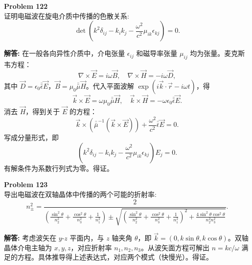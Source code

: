 \documentclass[12pt, a4paper, oneside]{ctexart}
\newenvironment{solution}{\par\noindent\textbf{解答:}\quad}{\par}
\begin{document}
\begin{mdframed}[backgroundcolor=gray!10, linewidth=0pt]
    \textbf{Problem 122} \\
    证明电磁波在旋电介质中传播的色散关系:
    \[
    \det\left( k^2 \delta_{ij} - k_i k_j - \frac{\omega^2}{c^2} \mu_{ik} \epsilon_{kj} \right) = 0.
    \]
\end{mdframed}
\begin{solution}
    在一般各向异性介质中，介电张量 $\epsilon_{ij}$ 和磁导率张量 $\mu_{ij}$ 均为张量。麦克斯韦方程：
    \[
    \nabla \times \vec{E} = i\omega \vec{B}, \quad \nabla \times \vec{H} = -i\omega \vec{D},
    \]
    其中 $\vec{D} = \epsilon_0 \bar{\bar{\epsilon}} \vec{E}$，$\vec{B} = \mu_0 \bar{\bar{\mu}} \vec{H}$。代入平面波解 $\exp(i\vec{k}\cdot\vec{r} - i\omega t)$，得
    \[
    \vec{k} \times \vec{E} = \omega \mu_0 \bar{\bar{\mu}} \vec{H}, \quad \vec{k} \times \vec{H} = -\omega \epsilon_0 \bar{\bar{\epsilon}} \vec{E}.
    \]
    消去 $\vec{H}$，得到关于 $\vec{E}$ 的方程：
    \[
    \vec{k} \times (\bar{\bar{\mu}}^{-1} (\vec{k} \times \vec{E})) + \frac{\omega^2}{c^2} \bar{\bar{\epsilon}} \vec{E} = 0.
    \]
    写成分量形式，即
    \[
    \left( k^2 \delta_{ij} - k_i k_j - \frac{\omega^2}{c^2} \mu_{ik} \epsilon_{kj} \right) E_j = 0.
    \]
    有解条件为系数行列式为零。得证。
\end{solution}

\begin{mdframed}[backgroundcolor=gray!10, linewidth=0pt]
    \textbf{Problem 123} \\
    导出电磁波在双轴晶体中传播的两个可能的折射率:
    \[
    n_{\pm}^2 = \frac{2}{\left( \frac{\sin^2\theta}{n_2^2} + \frac{\cos^2\theta}{n_3^2} + \frac{1}{n_1^2} \right) \pm \sqrt{ \left( \frac{\sin^2\theta}{n_2^2} + \frac{\cos^2\theta}{n_3^2} + \frac{1}{n_1^2} \right)^2 + \frac{4\sin^2\theta \cos^2\theta}{n_2^2 n_3^2} }}.
    \]
\end{mdframed}
\begin{solution}
    考虑波矢在 $y$-$z$ 平面内，与 $z$ 轴夹角 $\theta$，即 $\vec{k} = (0, k \sin\theta, k \cos\theta)$。双轴晶体介电主轴为 $x, y, z$，对应折射率 $n_1, n_2, n_3$。从波矢面方程可解出 $n = kc/\omega$ 满足的方程。具体推导得上述表达式，对应两个模式（快慢光）。得证。
\end{solution}
\end{document}

